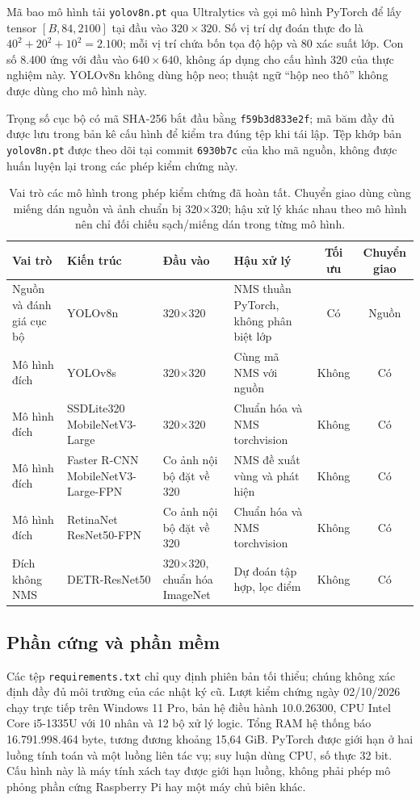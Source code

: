 \documentclass[a4paper,fleqn]{cas-dc}
\begin{document}
Mã bao mô hình tải \texttt{yolov8n.pt} qua Ultralytics và gọi mô hình PyTorch để lấy tensor $[B,84,2100]$ tại đầu vào $320\times320$. Số vị trí dự đoán thực đo là $40^2+20^2+10^2=2.100$; mỗi vị trí chứa bốn tọa độ hộp và 80 xác suất lớp. Con số 8.400 ứng với đầu vào $640\times640$, không áp dụng cho cấu hình 320 của thực nghiệm này. YOLOv8n không dùng hộp neo; thuật ngữ “hộp neo thô” không được dùng cho mô hình này.

Trọng số cục bộ có mã SHA-256 bắt đầu bằng \texttt{f59b3d833e2f}; mã băm đầy đủ được lưu trong bản kê cấu hình để kiểm tra đúng tệp khi tái lập. Tệp khớp bản \texttt{yolov8n.pt} được theo dõi tại commit \texttt{6930b7c} của kho mã nguồn, không được huấn luyện lại trong các phép kiểm chứng này.

\begin{table}[t]
\centering
\small
\caption{Vai trò các mô hình trong phép kiểm chứng đã hoàn tất. Chuyển giao dùng cùng miếng dán nguồn và ảnh chuẩn bị 320×320; hậu xử lý khác nhau theo mô hình nên chỉ đối chiếu sạch/miếng dán trong từng mô hình.}
\begin{tabularx}{\textwidth}{XXXXcc}
\toprule
Vai trò & Kiến trúc & Đầu vào & Hậu xử lý & Tối ưu & Chuyển giao \\
\midrule
Nguồn và đánh giá cục bộ & YOLOv8n & 320×320 & NMS thuần PyTorch, không phân biệt lớp & Có & Nguồn \\
Mô hình đích & YOLOv8s & 320×320 & Cùng mã NMS với nguồn & Không & Có \\
Mô hình đích & SSDLite320 MobileNetV3-Large & 320×320 & Chuẩn hóa và NMS torchvision & Không & Có \\
Mô hình đích & Faster R-CNN MobileNetV3-Large-FPN & Co ảnh nội bộ đặt về 320 & NMS đề xuất vùng và phát hiện & Không & Có \\
Mô hình đích & RetinaNet ResNet50-FPN & Co ảnh nội bộ đặt về 320 & Chuẩn hóa và NMS torchvision & Không & Có \\
Đích không NMS & DETR-ResNet50 & 320×320, chuẩn hóa ImageNet & Dự đoán tập hợp, lọc điểm & Không & Có \\
\bottomrule
\end{tabularx}
\label{tab:model_roles}
\end{table}

\subsection{Phần cứng và phần mềm}

Các tệp \texttt{requirements.txt} chỉ quy định phiên bản tối thiểu; chúng không xác định đầy đủ môi trường của các nhật ký cũ. Lượt kiểm chứng ngày 02/10/2026 chạy trực tiếp trên Windows 11 Pro, bản hệ điều hành 10.0.26300, CPU Intel Core i5-1335U với 10 nhân và 12 bộ xử lý logic. Tổng RAM hệ thống báo 16.791.998.464 byte, tương đương khoảng 15,64 GiB. PyTorch được giới hạn ở hai luồng tính toán và một luồng liên tác vụ; suy luận dùng CPU, số thực 32 bit. Cấu hình này là máy tính xách tay được giới hạn luồng, không phải phép mô phỏng phần cứng Raspberry Pi hay một máy chủ biên khác.
\end{document}
